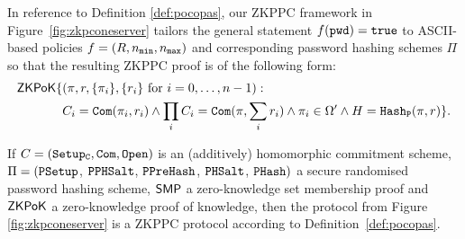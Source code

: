 \noindent
In reference to Definition \ref{def:pocopas}, our \ac{ZKPPC} framework in Figure~\ref{fig:zkpconeserver} tailors the general statement $f(\mathtt{pwd})=\mathtt{true}$ to \ac{ASCII}-based policies $f=(R,{n_\mathtt{min}},{n_\mathtt{max}})$ and corresponding password hashing schemes $\Pi$ so that the resulting \ac{ZKPPC} proof is of the following form:
\begin{align*}
\mathsf{ZKPoK}\{&(\pi,r,\{\pi_i\},\{r_i\}\textrm{ for }i=0,\ldots,n-1):\\
& C_i=\mathtt{Com}(\pi_i, r_i) \wedge \prod_iC_i=\mathtt{Com}(\pi, \sum_ir_i) \wedge \pi_i\in\Omega' \wedge H=\mathtt{Hash_P}(\pi,r)\}.
\end{align*}

\begin{theorem}\label{theo:singlegen}
If $C=(\mathtt{Setup_C},\mathtt{Com},\mathtt{Open})$ is an (additively) homomorphic commitment scheme, $\Pi=(\mathtt{PSetup}$, $\mathtt{PPHSalt}$, $\mathtt{PPreHash}$, $\mathtt{PHSalt}$, $\mathtt{PHash})$ a secure randomised password hashing scheme, $\mathsf{SMP}$ a zero-knowledge set membership proof and $\mathsf{ZKPoK}$ a zero-knowledge proof of knowledge, then the protocol from Figure \ref{fig:zkpconeserver} is a \ac{ZKPPC} protocol according to Definition~\ref{def:pocopas}.
\end{theorem}

